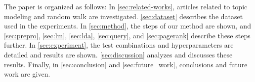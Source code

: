 The paper is organized as follows:
In \autoref{sec:related-works}, articles related to topic modeling and random walk are investigated.
\autoref{sec:dataset} describes the dataset used in the experiments.
In \autoref{sec:method}, the steps of our method are shown, and \autoref{sec:prepro}, \autoref{sec:lm}, \autoref{sec:lda}, \autoref{sec:query}, and \autoref{sec:pagerank} describe these steps further.
In \autoref{sec:experiment}, the test combinations and hyperparameters are detailed and results are shown.
\autoref{sec:discussion} analyzes and discusses these results.
Finally, in \autoref{sec:conclusion} and \autoref{sec:future_work}, conclusions and future work are given.
